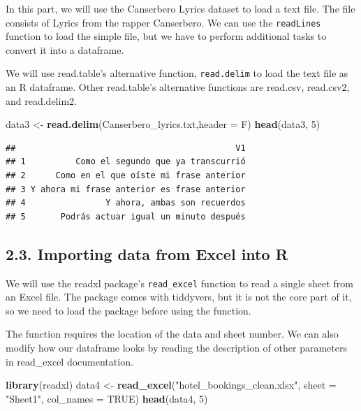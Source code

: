 \documentclass[
]{article}
\newenvironment{Shaded}{\begin{snugshade}}{\end{snugshade}}
\newcommand{\AttributeTok}[1]{\textcolor[rgb]{0.13,0.29,0.53}{#1}}
\newcommand{\ConstantTok}[1]{\textcolor[rgb]{0.56,0.35,0.01}{#1}}
\newcommand{\DecValTok}[1]{\textcolor[rgb]{0.00,0.00,0.81}{#1}}
\newcommand{\FunctionTok}[1]{\textcolor[rgb]{0.13,0.29,0.53}{\textbf{#1}}}
\newcommand{\NormalTok}[1]{#1}
\newcommand{\OtherTok}[1]{\textcolor[rgb]{0.56,0.35,0.01}{#1}}
\newcommand{\StringTok}[1]{\textcolor[rgb]{0.31,0.60,0.02}{#1}}
\begin{document}
In this part, we will use the Canserbero Lyrics dataset to load a text
file. The file consists of Lyrics from the rapper Canserbero. We can use
the \texttt{readLines} function to load the simple file, but we have to
perform additional tasks to convert it into a dataframe.

We will use read.table's alternative function, \texttt{read.delim} to
load the text file as an R dataframe. Other read.table's alternative
functions are read.csv, read.csv2, and read.delim2.

\begin{Shaded}
\begin{Highlighting}[]
\NormalTok{data3 }\OtherTok{\textless{}{-}} \FunctionTok{read.delim}\NormalTok{(}\StringTok{\textquotesingle{}Canserbero\_lyrics.txt\textquotesingle{}}\NormalTok{,}\AttributeTok{header =}\NormalTok{ F)}
\FunctionTok{head}\NormalTok{(data3, }\DecValTok{5}\NormalTok{)}
\end{Highlighting}
\end{Shaded}

\begin{verbatim}
##                                            V1
## 1          Como el segundo que ya transcurrió
## 2      Como en el que oíste mi frase anterior
## 3 Y ahora mi frase anterior es frase anterior
## 4                Y ahora, ambas son recuerdos
## 5       Podrás actuar igual un minuto después
\end{verbatim}

\hypertarget{importing-data-from-excel-into-r}{%
\subsection{2.3. Importing data from Excel into
R}\label{importing-data-from-excel-into-r}}

We will use the readxl package's \texttt{read\_excel} function to read a
single sheet from an Excel file. The package comes with tiddyvers, but
it is not the core part of it, so we need to load the package before
using the function.

The function requires the location of the data and sheet number. We can
also modify how our dataframe looks by reading the description of other
parameters in read\_excel documentation.

\begin{Shaded}
\begin{Highlighting}[]
\FunctionTok{library}\NormalTok{(readxl)}
\NormalTok{data4 }\OtherTok{\textless{}{-}} \FunctionTok{read\_excel}\NormalTok{(}\StringTok{"hotel\_bookings\_clean.xlsx"}\NormalTok{, }\AttributeTok{sheet =} \StringTok{"Sheet1"}\NormalTok{, }\AttributeTok{col\_names =} \ConstantTok{TRUE}\NormalTok{)}
\FunctionTok{head}\NormalTok{(data4, }\DecValTok{5}\NormalTok{)}
\end{Highlighting}
\end{Shaded}
\end{document}
